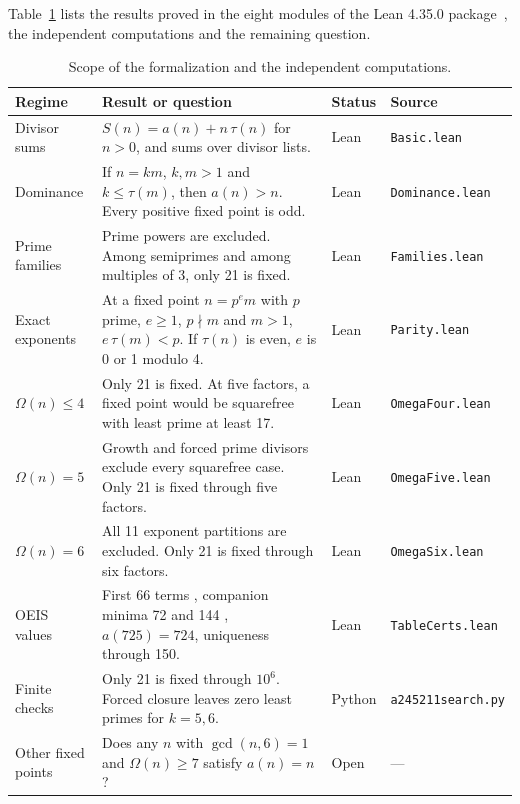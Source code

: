 \documentclass[11pt,reqno]{amsart}
\theoremstyle{plain}
\theoremstyle{definition}
\theoremstyle{remark}
\newcommand{\leanid}[1]{\texttt{\upshape\def\_{\char95\relax}#1}}
\begin{document}
Table~\ref{tab:scope} lists the results proved in the eight modules of the Lean 4.35.0 package~\cite{deMouraUllrich2021}, the independent computations and the remaining question.

\begin{table}[htbp]
\centering
\caption{Scope of the formalization and the independent computations.}
\label{tab:scope}
\small
\begin{tabular}{@{}l>{\raggedright\arraybackslash}p{6.9cm}l>{\raggedright\arraybackslash}p{3.4cm}@{}}
\toprule
Regime & Result or question & Status & Source \\
\midrule
Divisor sums & $S(n)=a(n)+n\,\tau(n)$ for $n>0$, and sums over divisor lists. & Lean & \leanid{Basic.lean} \\
Dominance & If $n=km$, $k,m>1$ and $k\le\tau(m)$, then $a(n)>n$. Every positive fixed point is odd. & Lean & \leanid{Dominance.lean} \\
Prime families & Prime powers are excluded. Among semiprimes and among multiples of 3, only 21 is fixed. & Lean & \leanid{Families.lean} \\
Exact exponents & At a fixed point $n=p^e m$ with $p$ prime, $e\ge1$, $p\nmid m$ and $m>1$, $e\,\tau(m)<p$. If $\tau(n)$ is even, $e$ is 0 or 1 modulo 4. & Lean & \leanid{Parity.lean} \\
$\Omega(n)\le4$ & Only 21 is fixed. At five factors, a fixed point would be squarefree with least prime at least 17. & Lean & \leanid{OmegaFour.lean} \\
$\Omega(n)=5$ & Growth and forced prime divisors exclude every squarefree case. Only 21 is fixed through five factors. & Lean & \leanid{OmegaFive.lean} \\
$\Omega(n)=6$ & All 11 exponent partitions are excluded. Only 21 is fixed through six factors. & Lean & \leanid{OmegaSix.lean} \\
OEIS values & First 66 terms \cite{OEIS-A245211}, companion minima 72 and 144 \cite{OEIS-A245213,OEIS-A245214}, $a(725)=724$, uniqueness through 150. & Lean & \leanid{TableCerts.lean} \\
Finite checks & Only 21 is fixed through $10^6$. Forced closure leaves zero least primes for $k=5,6$. & Python & \leanid{a245211\_\allowbreak search.py} \\
Other fixed points & Does any $n$ with $\gcd(n,6)=1$ and $\Omega(n)\ge7$ satisfy $a(n)=n$? & Open & --- \\
\bottomrule
\end{tabular}
\end{table}
\FloatBarrier
\end{document}
